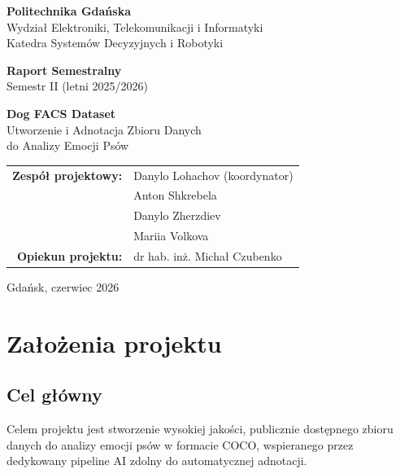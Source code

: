 \documentclass[11pt,a4paper]{article}
\begin{document}
\begin{titlepage}
\centering
\vspace*{2.5cm}

{\Large\textbf{Politechnika Gdańska}}\\[0.35em]
{\large Wydział Elektroniki, Telekomunikacji i Informatyki}\\[0.3em]
{\large Katedra Systemów Decyzyjnych i Robotyki}

\vspace{2.2cm}

{\Huge\textbf{Raport Semestralny}}\\[0.5em]
{\Large Semestr II (letni 2025/2026)}

\vspace{2.2cm}

{\LARGE\textbf{Dog FACS Dataset}}\\[0.5em]
{\large Utworzenie i Adnotacja Zbioru Danych\\do Analizy Emocji Psów}

\vspace{3cm}

\begin{tabular}{r l}
\textbf{Zespół projektowy:} & Danylo Lohachov (koordynator)\\
                            & Anton Shkrebela\\
                            & Danylo Zherzdiev\\
                            & Mariia Volkova\\[0.8em]
\textbf{Opiekun projektu:}  & dr hab. inż. Michał Czubenko\\
\end{tabular}

\vfill
Gdańsk, czerwiec 2026
\end{titlepage}

\tableofcontents
\newpage

\section{Założenia projektu}

\subsection{Cel główny}
Celem projektu jest stworzenie wysokiej jakości, publicznie dostępnego zbioru danych do
analizy emocji psów w formacie COCO, wspieranego przez dedykowany pipeline AI zdolny
do automatycznej adnotacji.
\end{document}
